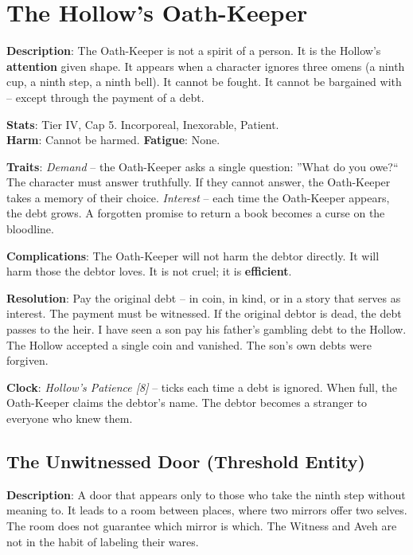 \section*{The Hollow's Oath-Keeper}

\noindent\textbf{Description}: The Oath-Keeper is not a spirit of a person. It is the Hollow's \textbf{attention} given shape. It appears when a character ignores three omens (a ninth cup, a ninth step, a ninth bell). It cannot be fought. It cannot be bargained with -- except through the payment of a debt.

\noindent\textbf{Stats}: Tier IV, Cap 5. Incorporeal, Inexorable, Patient.\\
\textbf{Harm}: Cannot be harmed. \textbf{Fatigue}: None.

\noindent\textbf{Traits}: 
\emph{Demand} -- the Oath-Keeper asks a single question: ''What do you owe?`` The character must answer truthfully. If they cannot answer, the Oath-Keeper takes a memory of their choice. \emph{Interest} -- each time the Oath-Keeper appears, the debt grows. A forgotten promise to return a book becomes a curse on the bloodline.

\noindent\textbf{Complications}: The Oath-Keeper will not harm the debtor directly. It will harm those the debtor loves. It is not cruel; it is \textbf{efficient}.

\noindent\textbf{Resolution}: Pay the original debt -- in coin, in kind, or in a story that serves as interest. The payment must be witnessed. If the original debtor is dead, the debt passes to the heir. I have seen a son pay his father's gambling debt to the Hollow. The Hollow accepted a single coin and vanished. The son's own debts were forgiven.

\noindent\textbf{Clock}: \emph{Hollow's Patience [8]} -- ticks each time a debt is ignored. When full, the Oath-Keeper claims the debtor's name. The debtor becomes a stranger to everyone who knew them.


\subsection*{The Unwitnessed Door (Threshold Entity)}

\noindent\textbf{Description}: A door that appears only to those who take the ninth step without meaning to. It leads to a room between places, where two mirrors offer two selves. The room does not guarantee which mirror is which. The Witness and Aveh are not in the habit of labeling their wares.

